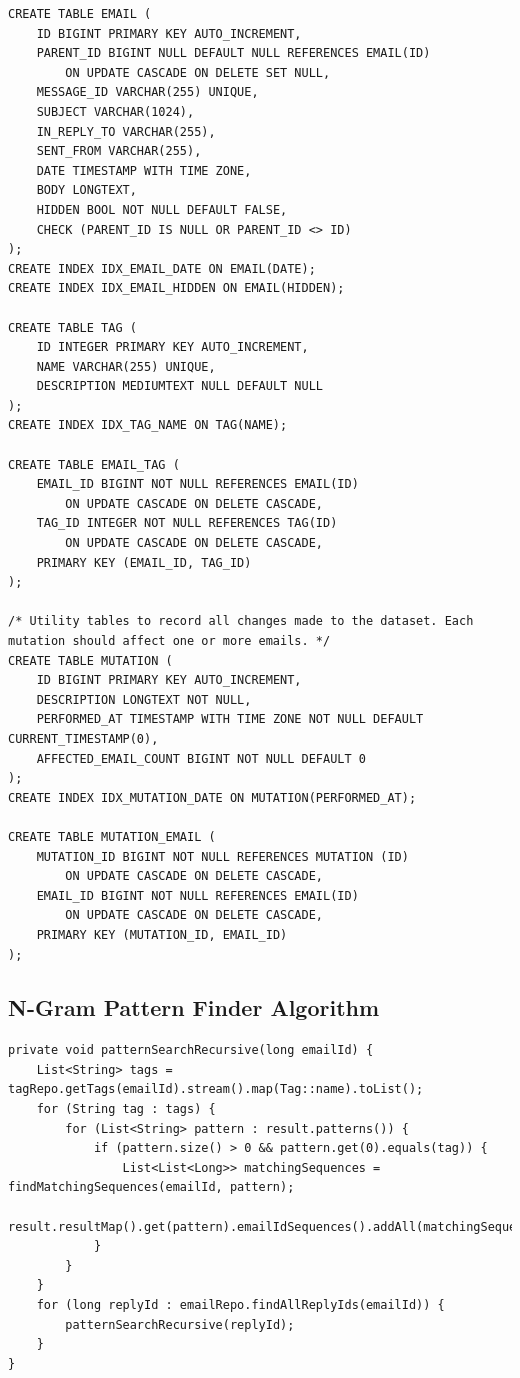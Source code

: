 \documentclass[a4paper, 12pt]{article}
\begin{document}
		\begin{verbatim}
CREATE TABLE EMAIL (
	ID BIGINT PRIMARY KEY AUTO_INCREMENT,
	PARENT_ID BIGINT NULL DEFAULT NULL REFERENCES EMAIL(ID)
		ON UPDATE CASCADE ON DELETE SET NULL,
	MESSAGE_ID VARCHAR(255) UNIQUE,
	SUBJECT VARCHAR(1024),
	IN_REPLY_TO VARCHAR(255),
	SENT_FROM VARCHAR(255),
	DATE TIMESTAMP WITH TIME ZONE,
	BODY LONGTEXT,
	HIDDEN BOOL NOT NULL DEFAULT FALSE,
	CHECK (PARENT_ID IS NULL OR PARENT_ID <> ID)
);
CREATE INDEX IDX_EMAIL_DATE ON EMAIL(DATE);
CREATE INDEX IDX_EMAIL_HIDDEN ON EMAIL(HIDDEN);

CREATE TABLE TAG (
	ID INTEGER PRIMARY KEY AUTO_INCREMENT,
	NAME VARCHAR(255) UNIQUE,
	DESCRIPTION MEDIUMTEXT NULL DEFAULT NULL
);
CREATE INDEX IDX_TAG_NAME ON TAG(NAME);

CREATE TABLE EMAIL_TAG (
	EMAIL_ID BIGINT NOT NULL REFERENCES EMAIL(ID)
		ON UPDATE CASCADE ON DELETE CASCADE,
	TAG_ID INTEGER NOT NULL REFERENCES TAG(ID)
		ON UPDATE CASCADE ON DELETE CASCADE,
	PRIMARY KEY (EMAIL_ID, TAG_ID)
);

/* Utility tables to record all changes made to the dataset. Each mutation should affect one or more emails. */
CREATE TABLE MUTATION (
	ID BIGINT PRIMARY KEY AUTO_INCREMENT,
	DESCRIPTION LONGTEXT NOT NULL,
	PERFORMED_AT TIMESTAMP WITH TIME ZONE NOT NULL DEFAULT CURRENT_TIMESTAMP(0),
	AFFECTED_EMAIL_COUNT BIGINT NOT NULL DEFAULT 0
);
CREATE INDEX IDX_MUTATION_DATE ON MUTATION(PERFORMED_AT);

CREATE TABLE MUTATION_EMAIL (
	MUTATION_ID BIGINT NOT NULL REFERENCES MUTATION (ID)
		ON UPDATE CASCADE ON DELETE CASCADE,
	EMAIL_ID BIGINT NOT NULL REFERENCES EMAIL(ID)
		ON UPDATE CASCADE ON DELETE CASCADE,
	PRIMARY KEY (MUTATION_ID, EMAIL_ID)
);
		\end{verbatim}
	
	\newpage
	\subsection{N-Gram Pattern Finder Algorithm}
		\label{sec:pattern-algorithm}
		
		\begin{verbatim}
private void patternSearchRecursive(long emailId) {
	List<String> tags = tagRepo.getTags(emailId).stream().map(Tag::name).toList();
	for (String tag : tags) {
		for (List<String> pattern : result.patterns()) {
			if (pattern.size() > 0 && pattern.get(0).equals(tag)) {
				List<List<Long>> matchingSequences = findMatchingSequences(emailId, pattern);
				result.resultMap().get(pattern).emailIdSequences().addAll(matchingSequences);
			}
		}
	}
	for (long replyId : emailRepo.findAllReplyIds(emailId)) {
		patternSearchRecursive(replyId);
	}
}
		\end{verbatim}
		
\end{document}
